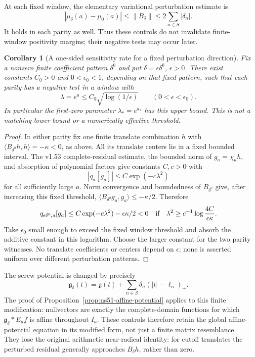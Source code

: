 \documentclass[11pt]{article}
\newtheorem{corollary}[theorem]{Corollary}
\theoremstyle{remark}
\newcommand{\norm}[1]{\left\lVert #1\right\rVert}
\begin{document}
At each fixed window, the elementary variational perturbation estimate is
\[
 |\mu_\delta(a)-\mu_0(a)|\le\norm{B_\delta}
                    \le2\sum_{n\in S}|\delta_n|.
\]
It holds in each parity as well. Thus these controls do not invalidate
finite-window positivity margins; their negative tests may occur later.

\begin{corollary}[A one-sided sensitivity rate for a fixed perturbation direction]\label{cor:ns57-fixed-direction-sensitivity}
Fix a nonzero finite coefficient pattern $\delta^0$ and put
$\delta=\epsilon\delta^0$, $\epsilon>0$. There exist constants
$C_0>0$ and $0<\epsilon_0<1$, depending on that fixed pattern, such
that each parity has a negative test in a window with
\[
 \lambda=e^a\le C_0\sqrt{\log(1/\epsilon)}
       \qquad(0<\epsilon<\epsilon_0).
\]
In particular the first-zero parameter $\lambda_*=e^{a_*}$ has this upper bound.
This is not a matching lower bound or a numerically effective threshold.
\end{corollary}
\begin{proof}
In either parity fix one finite translate combination $h$ with
$\langle B_{\delta^0}h,h\rangle=-\kappa<0$, as above.
All its translate centers lie in a fixed bounded interval. The
v1.53 complete-residual estimate, the bounded norm of $g_a=\chi_a h$,
and absorption of polynomial factors give constants $C,c>0$ with
\[
 |q_a[g_a]|\le C\exp(-c\lambda^2)
\]
for all sufficiently large $a$. Norm convergence and boundedness of
$B_{\delta^0}$ give, after increasing this fixed threshold,
$\langle B_{\delta^0}g_a,g_a\rangle\le-\kappa/2$.
Therefore
\[
 q_{\epsilon\delta^0,a}[g_a]
 \le C\exp(-c\lambda^2)-\epsilon\kappa/2<0
 \quad\hbox{if}\quad
 \lambda^2\ge c^{-1}\log\frac{4C}{\epsilon\kappa}.
\]
Take $\epsilon_0$ small enough to exceed the fixed window threshold
and absorb the additive constant in this logarithm. Choose the larger
constant for the two parity witnesses. No translate coefficients or
centers depend on $\epsilon$; none is asserted uniform over different
perturbation patterns.
\end{proof}

The screw potential is changed by precisely
\[
 \mathfrak g_\delta(t)=\mathfrak g(t)+
                 \sum_{n\in S}\delta_n(|t|-\ell_n)_+.
\]
The proof of Proposition~\ref{prop:ns51-affine-potential} applies to this finite modification:
nullvectors are exactly the complete-domain functions for which
$\mathfrak g_\delta*E_af$ is affine throughout $I_a$.
These controls therefore retain the global affine-potential equation
in its modified form, not just a finite matrix resemblance.
They lose the original arithmetic near-radical identity:
for cutoff translates the perturbed residual generally approaches
$B_\delta h$, rather than zero.
\end{document}
